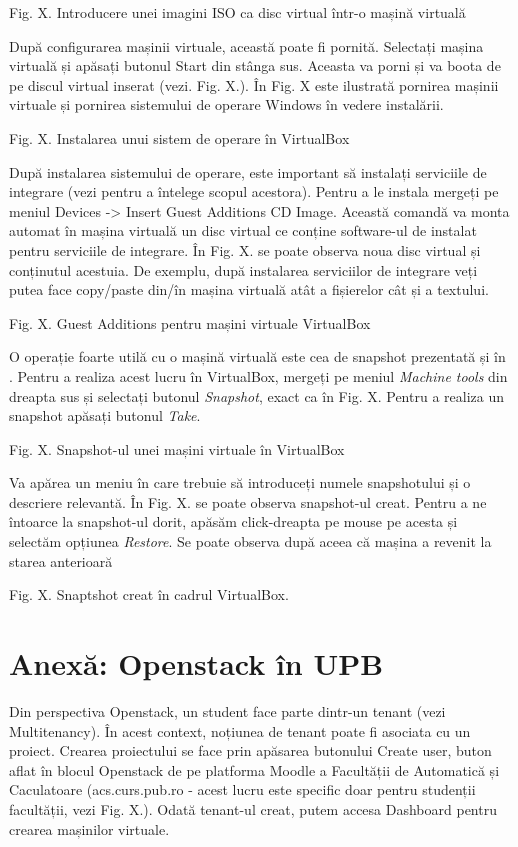 Fig. X. Introducere unei imagini ISO ca disc virtual într-o mașină virtuală

După configurarea mașinii virtuale, această poate fi pornită. Selectați mașina
virtuală și apăsați butonul Start din stânga sus. Aceasta va porni și va boota
de pe discul virtual inserat (vezi. Fig. X.). În Fig. X este ilustrată pornirea
mașinii virtuale și pornirea sistemului de operare Windows în vedere instalării.

Fig. X. Instalarea unui sistem de operare în VirtualBox

După instalarea sistemului de operare, este important să instalați serviciile de
integrare (vezi  pentru a
întelege scopul acestora). Pentru a le instala mergeți pe meniul Devices ->
Insert Guest Additions CD Image. Această comandă va monta automat în mașina
virtuală un disc virtual ce conține software-ul de instalat pentru serviciile de
integrare. În Fig. X. se poate observa noua disc virtual și conținutul acestuia.
De exemplu, după instalarea serviciilor de integrare veți putea face copy/paste
din/în mașina virtuală atât a fișierelor cât și a textului.

Fig. X. Guest Additions pentru mașini virtuale VirtualBox

O operație foarte utilă cu o mașină virtuală este cea de snapshot prezentată și
în . Pentru a realiza acest lucru în
VirtualBox, mergeți pe meniul \textit{Machine tools} din dreapta sus și
selectați butonul \textit{Snapshot}, exact ca în Fig. X. Pentru a realiza un
snapshot apăsați butonul \textit{Take}.

Fig. X. Snapshot-ul unei mașini virtuale în VirtualBox

Va apărea un meniu în care trebuie să introduceți numele snapshotului și o
descriere relevantă. În Fig. X. se poate observa snapshot-ul creat. Pentru a ne
întoarce la snapshot-ul dorit, apăsăm click-dreapta pe mouse pe acesta și
selectăm opțiunea \textit{Restore}. Se poate observa după aceea că mașina a
revenit la starea anterioară

Fig. X. Snaptshot creat în cadrul VirtualBox.

\section{Anexă: Openstack în UPB}
\label{sec:vm-openstack}

Din perspectiva Openstack, un student face parte dintr-un tenant (vezi
Multitenancy). În acest context, noțiunea de tenant poate fi asociata cu un
proiect. Crearea proiectului se face prin apăsarea butonului Create user, buton
aflat în blocul Openstack de pe platforma Moodle a Facultății de Automatică și
Caculatoare (acs.curs.pub.ro - acest lucru este specific doar pentru studenții
facultății, vezi Fig. X.). Odată tenant-ul creat, putem accesa Dashboard pentru
crearea mașinilor virtuale.

